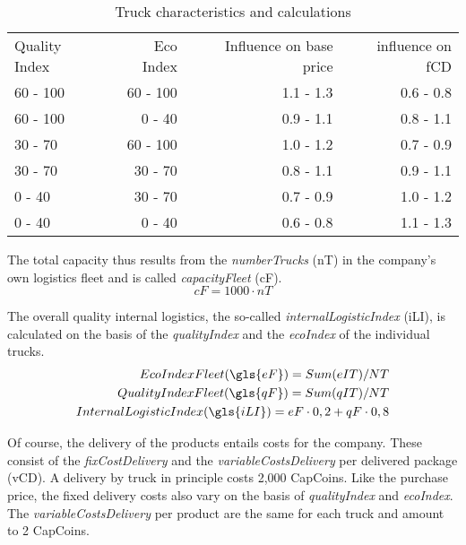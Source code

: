 \begin{table}[ht]
    \centering
    \begin{tabular}{|l|r|r|r|}
    \hline
    Quality Index & Eco Index & Influence on base price & influence on fCD \\
    60 - 100      & 60 - 100   & 1.1 - 1.3   & 0.6 - 0.8       \\
    60 - 100      & 0 - 40     & 0.9 - 1.1   & 0.8 - 1.1       \\
    30 - 70       & 60 - 100   & 1.0 - 1.2   & 0.7 - 0.9       \\
    30 - 70       & 30 - 70    & 0.8 - 1.1   & 0.9 - 1.1       \\
    0 - 40        & 30 - 70    & 0.7 - 0.9   & 1.0 - 1.2       \\
    0 - 40        & 0 - 40     & 0.6 - 0.8   & 1.1 - 1.3       \\
    \hline
    \end{tabular}
    \caption{Truck characteristics and calculations}
    \label{Truck_characteristics}
\end{table}

The total capacity thus results from the \textit{numberTrucks} (\gls{nT}) in the company's own logistics fleet and is called \textit{capacityFleet} (\gls{cF}). 
\begin{equation}
\label{func:capacityFleet}
    cF = 1000 \cdot nT
\end{equation}

The overall quality internal logistics, the so-called \textit{internalLogisticIndex} (\gls{iLI}), is calculated on the basis of the \textit{qualityIndex} and the \textit{ecoIndex} of the individual trucks.
\begin{equation}
\label{func:internalLogisticIndex}
\begin{aligned}
    Eco Index Fleet (\gls{eF}) = Sum (eIT) / NT \\
    Quality Index Fleet (\gls{qF}) = Sum (qIT) / NT \\
    Internal Logistic Index (\gls{iLI}) = eF \cdot 0,2 + qF \cdot 0,8 \\
\end{aligned}
\end{equation}

Of course, the delivery of the products entails costs for the company. These consist of the \textit{fixCostDelivery} and the \textit{variableCostsDelivery} per delivered package (\gls{vCD}). 
A delivery by truck in principle costs 2,000 CapCoins. Like the purchase price, the fixed delivery costs also vary on the basis of \textit{qualityIndex} and \textit{ecoIndex}. The \textit{variableCostsDelivery} per product are the same for each truck and amount to 2 CapCoins.

